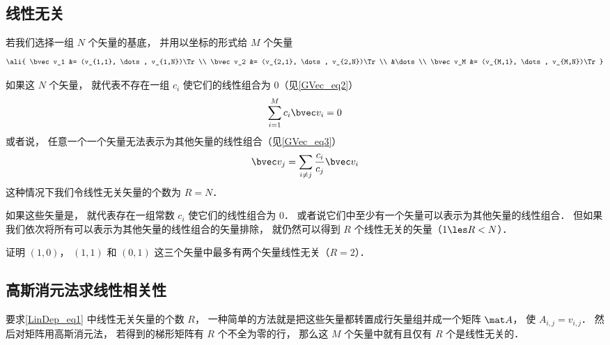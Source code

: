 

\subsection{线性无关}

若我们选择一组 $N$ 个矢量的基底， 并用以坐标的形式给 $M$ 个矢量
\begin{equation}\label{LinDep_eq1}
\ali{
\bvec v_1 &= (v_{1,1}, \dots, v_{1,N})\Tr \\
\bvec v_2 &= (v_{2,1}, \dots, v_{2,N})\Tr \\
&\dots \\
\bvec v_M &= (v_{M,1}, \dots, v_{M,N})\Tr
}\end{equation}

如果这 $N$ 个矢量， 就代表不存在一组 $c_i$ 使它们的线性组合为 0（见\autoref{GVec_eq2}）
\begin{equation}
\sum_{i=1}^M c_i\bvec v_i = 0
\end{equation}
或者说， 任意一个一个矢量无法表示为其他矢量的线性组合（见\autoref{GVec_eq3}）%
\begin{equation}
\bvec v_j = \sum_{i \ne j}\frac{c_i}{c_j} \bvec v_i
\end{equation}
这种情况下我们令线性无关矢量的个数为 $R = N$．

如果这些矢量是， 就代表存在一组常数 $c_i$ 使它们的线性组合为 0． 或者说它们中至少有一个矢量可以表示为其他矢量的线性组合． 但如果我们依次将所有可以表示为其他矢量的线性组合的矢量排除， 就仍然可以得到  $R$ 个线性无关的矢量（$1 \les R < N$）．

\begin{exer}{}
证明 $(1,0)$， $(1,1)$ 和 $(0,1)$ 这三个矢量中最多有两个矢量线性无关（$R = 2$）．
\end{exer}

\subsection{高斯消元法求线性相关性}
要求\autoref{LinDep_eq1} 中线性无关矢量的个数 $R$， 一种简单的方法就是把这些矢量都转置成行矢量组并成一个矩阵 $\mat A$， 使 $A_{i,j} = v_{i,j}$． 然后对矩阵用高斯消元法， 若得到的梯形矩阵有 $R$ 个不全为零的行， 那么这 $M$ 个矢量中就有且仅有 $R$ 个是线性无关的．





 